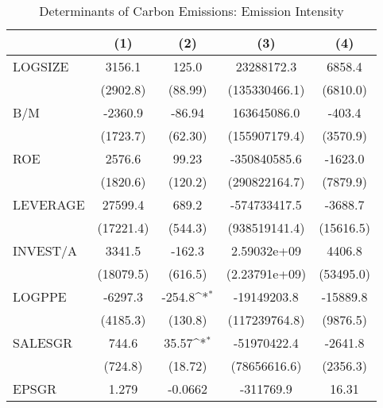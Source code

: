 \begin{table}[htbp]\centering
\def\sym#1{\ifmmode^{#1}\else\(^{#1}\)\fi}
\caption{Determinants of Carbon Emissions: Emission Intensity}
\begin{tabular}{l*{4}{c}}
\hline\hline
                    &\multicolumn{1}{c}{(1)}         &\multicolumn{1}{c}{(2)}         &\multicolumn{1}{c}{(3)}         &\multicolumn{1}{c}{(4)}         \\
\hline
LOGSIZE             &      3156.1         &       125.0         &  23288172.3         &      6858.4         \\
                    &    (2902.8)         &     (88.99)         &(135330466.1)         &    (6810.0)         \\
B/M                 &     -2360.9         &      -86.94         & 163645086.0         &      -403.4         \\
                    &    (1723.7)         &     (62.30)         &(155907179.4)         &    (3570.9)         \\
ROE                 &      2576.6         &       99.23         &-350840585.6         &     -1623.0         \\
                    &    (1820.6)         &     (120.2)         &(290822164.7)         &    (7879.9)         \\
LEVERAGE            &     27599.4         &       689.2         &-574733417.5         &     -3688.7         \\
                    &   (17221.4)         &     (544.3)         &(938519141.4)         &   (15616.5)         \\
INVEST/A            &      3341.5         &      -162.3         & 2.59032e+09         &      4406.8         \\
                    &   (18079.5)         &     (616.5)         &(2.23791e+09)         &   (53495.0)         \\
LOGPPE              &     -6297.3         &      -254.8\sym{*}  & -19149203.8         &    -15889.8         \\
                    &    (4185.3)         &     (130.8)         &(117239764.8)         &    (9876.5)         \\
SALESGR             &       744.6         &       35.57\sym{*}  & -51970422.4         &     -2641.8         \\
                    &     (724.8)         &     (18.72)         &(78656616.6)         &    (2356.3)         \\
EPSGR               &       1.279         &     -0.0662         &   -311769.9         &       16.31         \\

\end{tabular}
\end{table}
